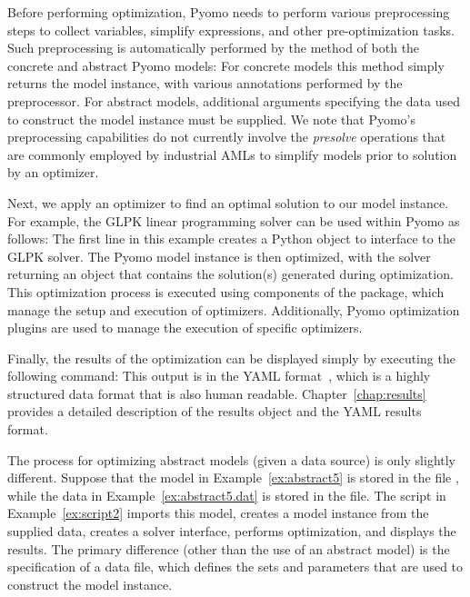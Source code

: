 Before performing optimization, Pyomo needs to perform various preprocessing steps to 
collect variables, simplify expressions, and other pre-optimization tasks. Such preprocessing 
is automatically performed by the  method of both the concrete and abstract Pyomo 
models:
For concrete models this method simply returns the model instance, with various annotations 
performed by the preprocessor. For abstract models, additional arguments specifying the 
data used to construct the model instance must be supplied. We note that Pyomo's preprocessing capabilities do not 
currently involve the \textit{presolve} operations that are commonly employed by industrial
AMLs to simplify models prior to solution by an optimizer.

Next, we apply an optimizer to find an optimal solution to our model instance.  For example, 
the GLPK \cite{glpk} linear programming solver can be used within Pyomo as follows:
The first line in this example creates a Python object to interface to the GLPK solver.
The Pyomo model instance is then optimized, with the solver returning an object that 
contains the solution(s) generated during optimization. This optimization process is 
executed using components of the  package, which manage the setup and execution 
of optimizers.  Additionally, Pyomo optimization plugins are used to manage the
execution of specific optimizers.

Finally, the results of the optimization can be displayed simply by executing the
following command:
This output is in the YAML format~\cite{YAML}, which is a highly structured data format 
that is also human readable.  
Chapter~\ref{chap:results} provides a detailed description 
of the results object and the YAML results format.
\fi

The process for optimizing abstract models (given a data source) is only slightly different.  
Suppose that the model in Example~\ref{ex:abstract5} is stored in the file \linebreak {}, 
while the data in Example~\ref{ex:abstract5.dat} is stored in the file\linebreak {}.
The script in Example~\ref{ex:script2} imports this model, creates a model instance from the
supplied data, creates a solver interface, performs optimization, and displays the results.  
The primary difference (other than the use of an abstract model) is the specification of a 
data file, which defines the sets and parameters that are used to construct the model 
instance.

